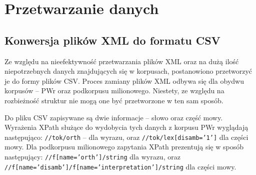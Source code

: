 \section{Przetwarzanie danych}
	\subsection{Konwersja plików XML do formatu CSV}
	Ze względu na nieefektywność przetwarzania plików XML oraz na dużą ilość niepotrzebnych danych znajdujących się w korpusach, postanowiono przetworzyć je do formy plików CSV.
Proces zamiany plików XML odbywa się dla obydwu korpusów -- PWr oraz podkorpusu milionowego.
	Niestety, ze względu na rozbieżność struktur nie mogą one być przetworzone w ten sam sposób.
	
\begin{sloppypar}
Do pliku CSV zapisywane są dwie informacje -- słowo oraz część mowy.
Wyrażenia XPath służące do wydobycia tych danych z korpusu PWr wyglądają następująco:
\texttt{//tok/orth} -- dla wyrazu, oraz \texttt{//tok/lex[disamb='1']} dla części mowy. Dla podkorpusu milionowego zapytania XPath prezentują się w sposób następujący: \texttt{//f[name='orth']/string} dla wyrazu, oraz \texttt{//f[name='disamb']/f[name='interpretation']/string} dla części mowy.
\end{sloppypar}

